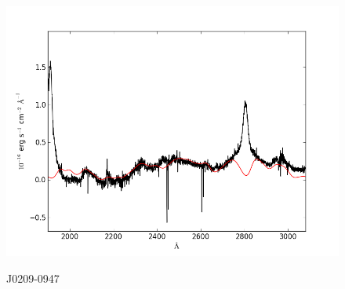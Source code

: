 \documentclass[usenatbib]{mn2e}
\begin{document}
\begin{figure}
\begin{center}
\vspace{5mm}
\includegraphics[width=0.49\linewidth,angle=0]{./red/fe_fit_SBB_3.png}\\

\end{center} 
\caption{J0209-0947 \label{fig:landscape}}   
\end{figure}

\newpage
\end{document}
